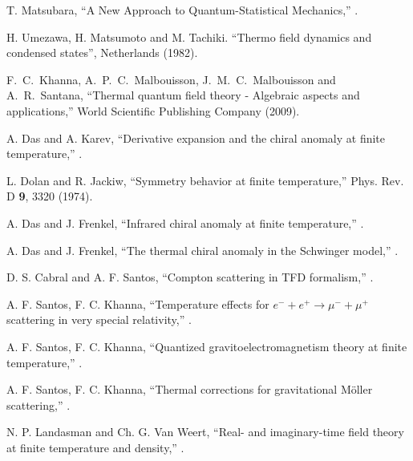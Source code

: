\documentclass[11pt,showpacs,preprintnumbers,amsmath,amssymb,prd,nofootinbib,superscriptaddress]{revtex4-2}
\begin{document}
\begin{thebibliography}{99}
 T. Matsubara, ``A New Approach to Quantum-Statistical Mechanics,'' .

 H. Umezawa, H. Matsumoto and M. Tachiki. ``Thermo field dynamics and condensed states'', Netherlands (1982).

  F.~C.~Khanna, A.~P.~C.~Malbouisson, J.~M.~C.~Malbouisson and A.~R.~Santana,
``Thermal quantum field theory - Algebraic aspects and applications,''
World Scientific Publishing Company (2009).

 A. Das and A. Karev, ``Derivative expansion and the chiral anomaly at finite temperature,'' .

 L. Dolan and R. Jackiw, ``Symmetry behavior at finite temperature,''  {{Phys. Rev. D} {\bf 9}, 3320 (1974)}.

 A. Das and J. Frenkel, ``Infrared chiral anomaly at finite temperature,'' .

 A. Das and J. Frenkel, ``The thermal chiral anomaly in the Schwinger model,'' .

 D. S. Cabral and A. F. Santos, ``Compton scattering in TFD formalism,'' .

 A. F. Santos, F. C. Khanna, ``Temperature effects for \( e^- + e^+ \rightarrow \mu^- + \mu^+ \) scattering in very special relativity,'' .

 A. F. Santos, F. C. Khanna, ``Quantized gravitoelectromagnetism theory at finite temperature,'' .

 A. F. Santos, F. C. Khanna, ``Thermal corrections for gravitational M{\"o}ller scattering,'' .

 N. P. Landasman and Ch. G. Van Weert, ``Real- and imaginary-time field theory at finite temperature and density,'' .

\end{thebibliography}
\end{document}
